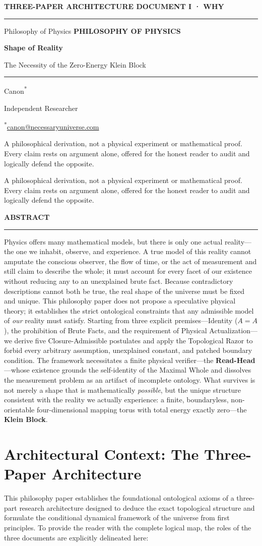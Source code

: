 \documentclass[11pt]{article}
\makeatletter
\theoremstyle{canonstyle}
\newcommand{\CanonTitlePage}{%
\begin{titlepage}
\thispagestyle{titlepage}
\vspace*{0.62cm}
{\sffamily\footnotesize\bfseries\color{seriesMuted}
THREE-PAPER ARCHITECTURE \hfill \CanonStage\par}
\vspace{0.42cm}
{\color{seriesAccent}\rule{\textwidth}{1.05pt}}\par
\vspace{1.65cm}
\ifx\CanonGenre\empty\else
{\sffamily\footnotesize\bfseries\color{seriesMuted}\MakeUppercase{\CanonGenre}}\par
\vspace{0.45cm}\fi
{\sffamily\bfseries\fontsize{28}{32}\selectfont\color{seriesInk}\hyphenpenalty=10000\exhyphenpenalty=10000\CanonTitle\par}
\vspace{0.52cm}
{\sffamily\large\color{seriesAccent}\CanonSubtitle\par}
\vspace{0.78cm}
{\color{seriesAccent}\rule{0.24\textwidth}{0.9pt}}\par
\vspace{0.95cm}
{\normalsize\sffamily Canon\textsuperscript{*}\;\orcidlink{0009-0001-9037-6209}\par}
\vspace{0.25cm}
{\small\sffamily\color{seriesMuted}Independent Researcher\par}
\vspace{0.16cm}
{\small\sffamily\color{seriesMuted}\textsuperscript{*}\href{mailto:canon@necessaryuniverse.com}{canon@necessaryuniverse.com}\par}
\vfill
\ifx\CanonDeck\empty\else
\begin{tcolorbox}[
  enhanced,
  colback=seriesPaper,
  colframe=seriesRule,
  boxrule=0.45pt,
  leftrule=2.4pt,
  arc=1.5pt,
  left=11pt,right=11pt,top=9pt,bottom=9pt,
  width=0.94\textwidth
]
\small\sffamily\color{seriesMuted}
\CanonDeck
\end{tcolorbox}
\vspace{0.65cm}
\fi

\end{titlepage}
}
\newenvironment{CanonAbstract}{%
  \begin{center}
  {\sffamily\footnotesize\bfseries\color{seriesMuted}\MakeUppercase{Abstract}}\\[-0.05em]
  {\color{seriesAccent}\rule{0.16\textwidth}{0.75pt}}
  \end{center}
  \begin{tcolorbox}[
    enhanced,
    breakable,
    colback=white,
    colframe=seriesRule,
    boxrule=0.4pt,
    leftrule=2.2pt,
    arc=1pt,
    left=12pt,right=12pt,top=9pt,bottom=9pt,
    before skip=5pt,after skip=4pt
  ]
  \small
}{%
  \end{tcolorbox}
}
\newcommand{\CanonStage}{DOCUMENT I · WHY}
\newcommand{\CanonGenre}{Philosophy of Physics}
\newcommand{\CanonTitle}{Shape of Reality}
\newcommand{\CanonSubtitle}{The Necessity of the Zero-Energy Klein Block}
\newcommand{\CanonDeck}{A philosophical derivation, not a physical experiment or mathematical proof. Every claim rests on argument alone, offered for the honest reader to audit and logically defend the opposite.}
\makeatother
\begin{document}
\CanonTitlePage

\setcounter{page}{1}

\begin{CanonAbstract}
Physics offers many mathematical models, but there is only one actual reality---the one we inhabit, observe, and experience. A true model of this reality cannot amputate the conscious observer, the flow of time, or the act of measurement and still claim to describe the whole; it must account for every facet of our existence without reducing any to an unexplained brute fact. Because contradictory descriptions cannot both be true, the real shape of the universe must be fixed and unique. This philosophy paper does not propose a speculative physical theory; it establishes the strict ontological constraints that any admissible model of \emph{our} reality must satisfy. Starting from three explicit premises---Identity ($A=A$), the prohibition of Brute Facts, and the requirement of Physical Actualization---we derive five Closure-Admissible postulates and apply the Topological Razor to forbid every arbitrary assumption, unexplained constant, and patched boundary condition. The framework necessitates a finite physical verifier---the \textbf{Read-Head}---whose existence grounds the self-identity of the Maximal Whole and dissolves the measurement problem as an artifact of incomplete ontology. What survives is not merely a shape that is mathematically \emph{possible}, but the unique structure consistent with the reality we actually experience: a finite, boundaryless, non-orientable four-dimensional mapping torus with total energy exactly zero---the \textbf{Klein Block}.
\end{CanonAbstract}

\section*{Architectural Context: The Three-Paper Architecture}
This philosophy paper establishes the foundational ontological axioms of a three-part research architecture designed to deduce the exact topological structure and formulate the conditional dynamical framework of the universe from first principles. To provide the reader with the complete logical map, the roles of the three documents are explicitly delineated here:
\end{document}
